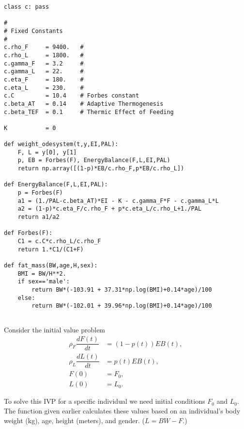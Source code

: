 \begin{lstlisting}
class c: pass

# 
# Fixed Constants
# 
c.rho_F		= 9400.   # 
c.rho_L		= 1800.   #
c.gamma_F	= 3.2     # 
c.gamma_L	= 22.     # 
c.eta_F		= 180.    # 
c.eta_L		= 230.    # 
c.C			= 10.4    # Forbes constant
c.beta_AT	= 0.14    # Adaptive Thermogenesis
c.beta_TEF	= 0.1     # Thermic Effect of Feeding

K 			= 0

def weight_odesystem(t,y,EI,PAL):
	F, L = y[0], y[1]
	p, EB = Forbes(F), EnergyBalance(F,L,EI,PAL)
	return np.array([(1-p)*EB/c.rho_F,p*EB/c.rho_L]) 

def EnergyBalance(F,L,EI,PAL):
	p = Forbes(F)
	a1 = (1./PAL-c.beta_AT)*EI - K - c.gamma_F*F - c.gamma_L*L
	a2 = (1-p)*c.eta_F/c.rho_F + p*c.eta_L/c.rho_L+1./PAL
	return a1/a2

def Forbes(F):
	C1 = c.C*c.rho_L/c.rho_F
	return 1.*C1/(C1+F)

def fat_mass(BW,age,H,sex):
	BMI = BW/H**2.
	if sex=='male': 
		return BW*(-103.91 + 37.31*np.log(BMI)+0.14*age)/100
	else: 
		return BW*(-102.01 + 39.96*np.log(BMI)+0.14*age)/100
	
\end{lstlisting}



\begin{problem}
Consider the initial value problem
\begin{subequations}
\begin{align*}
\rho_F \dfrac{dF(t)}{dt} &= (1-p(t)) EB(t),\\ %
\rho_L \dfrac{dL(t)}{dt} &= p(t) EB(t),\\%
F(0) &= F_0, \\
L(0) &= L_0.
\end{align*}
\end{subequations}

To solve this IVP for a specific individual we need initial conditions $F_0$ and $L_0.$ The function  given earlier calculates these values based on an individual's body weight (kg), age, height (meters), and gender. ($L = BW - F$.)

\end{problem}











